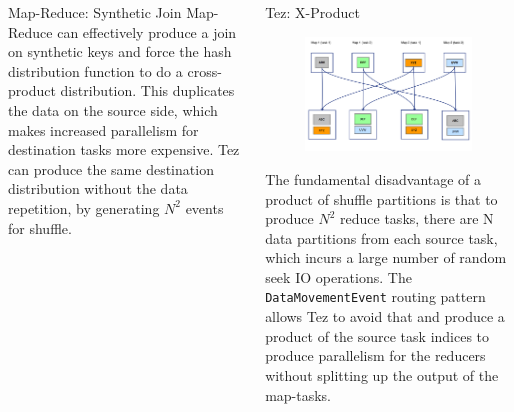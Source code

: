 \documentclass[final]{beamer}
\newlength{\onecolwid}
\newlength{\twocolwid}
\begin{document}
\begin{frame}[t]
\begin{columns}[t]
\begin{column}{\twocolwid}
\begin{columns}[t,totalwidth=\twocolwid]
\begin{column}{\onecolwid}
\begin{block}{Map-Reduce: Synthetic Join}
Map-Reduce can effectively produce a join on synthetic keys and force the hash distribution
function to do a cross-product distribution. This duplicates the data on the 
source side, which makes increased parallelism for destination tasks more expensive.
Tez can produce the same destination distribution without the data repetition, by generating 
${N}^2$ events for shuffle.

\end{block}


\end{column} %

\begin{column}{\onecolwid} %


\begin{block}{Tez: X-Product}


\begin{figure}
\includegraphics{figures/Tez-XProd-1.png}
\end{figure}

The fundamental disadvantage of a product of shuffle partitions is that to produce ${N}^2$ reduce tasks,
there are N data partitions from each source task, which incurs a large number of random seek IO operations.
The \texttt{DataMovementEvent} routing pattern allows Tez to avoid that and produce a product of the source
task indices to produce parallelism for the reducers without splitting up the output of the map-tasks.


\end{block}
\end{column}
\end{columns}
\end{column}
\end{columns}
\end{frame}
\end{document}
